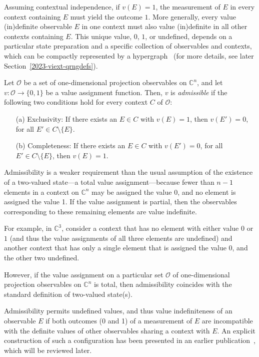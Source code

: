 \documentclass[%
 superscriptaddress,
  preprint,
 showpacs,
 showkeys,
 nofootinbib,
  amsmath,amssymb,
 pra,
  longbibliography,
  floatfix,
 ]{revtex4-2}
\theoremstyle{definition}
\newcommand{\C}{\mathbb{C}}
\begin{document}
Assuming contextual independence, if  $v(E)=1$, the measurement of $E$ in every context containing $E$ must yield the outcome  $1$.
More generally, every value (in)definite observable $E$ in one context must also value (in)definite in all other contexts containing $E$.
This unique value, $0$, $1$, or undefined, depends on a particular state preparation and a specific collection of observables and contexts, which can be compactly represented by a hypergraph~\cite{greechie:71,Bretto-MR3077516} (for more details, see later Section~\ref{2023-viext-qrngdefs}).


Let $\mathcal{O}$ be a set of one-dimensional projection observables on $\C^n$, and let $v:\mathcal{O}\to\{0,1\}$ be a value assignment function.
Then, $v$ is {\it admissible} if the following two conditions hold for every context $C$ of $\mathcal{O}$:
        \begin{itemize}
                \item[(a)] Exclusivity: If there exists an $E\in C$ with $v(E)=1$, then $v(E')=0$, for all $E'\in C\setminus\{E\}$.
                \item[(b)] Completeness:                  If there exists an $E\in C$ with $v(E')=0$,   for all $E'\in C\setminus\{E\}$, then $v(E)=1$.
        \end{itemize}




Admissibility is a weaker requirement than the usual assumption of the existence
of a two-valued state---a total value assignment---because fewer than $n-1$ elements in a context on $\C^n$ may be assigned the value 0, and no element is assigned the value 1. If the value assignment is partial, then the observables corresponding to these remaining elements are value indefinite.

For example, in $\C^3$, consider a  context that has no element with either value $0$ or $1$ (and thus the value assignments of all three elements are undefined) and another context that has only a single element that is assigned the value $0$, and the other two undefined.

However, if the value assignment on a particular set $\mathcal{O}$ of one-dimensional projection observables on $\C^n$ is total,
then admissibility coincides with the standard definition of two-valued state(s).


Admissibility permits undefined values, and thus value indefiniteness of an observable $E$ if both outcomes (0 and 1) of a measurement of $E$
are incompatible with the definite values of other observables sharing a context with $E$.
An explicit construction of such a configuration has been presented in an earlier publication~\cite{2015-AnalyticKS}, which will be reviewed later.
\end{document}
